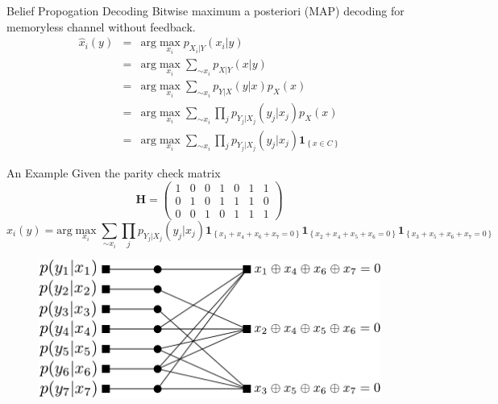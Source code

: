 \documentclass{beamer}
\begin{document}
  \begin{frame}{Belief Propogation Decoding}
  Bitwise maximum a posteriori (MAP) decoding for memoryless channel without feedback.
  \begin{eqnarray}
  \hat x_i( y) 	&=& \text{arg} \max_{x_i}p_{X_{i}|Y}(x_{i}| y) \label{eq:1}\\
		&=& \text{arg} \max_{x_i}\sum_{\sim x_i}p_{X|Y}( x| y) \label{eq:2}\\
		&=& \text{arg} \max_{x_i}\sum_{\sim x_i}p_{Y|X}( y| x)p_{X}( x) \label{eq:3}\\
		&=& \text{arg} \max_{x_i}\sum_{\sim x_i}\prod_{j}p_{Y_j|X_j}(y_j|x_j)p_{X}( x)\label{eq:4} \\
   		&=& \text{arg} \max_{x_i}\sum_{\sim x_i}\prod_{j}p_{Y_j|X_j}(y_j|x_j)\mathbf{1}_{\left\lbrace x\in C\right\rbrace} \label{eq:5}
  \end{eqnarray} 
  \end{frame}


  \begin{frame}{An Example}
   Given the parity check matrix
\begin{equation}
\label{H_matrix}
 \textbf{H} = 
 \left(
\begin{array}{ccccccc}
1 & 0 & 0 & 1 & 0 & 1 & 1  \\
0 & 1 & 0 & 1 & 1 & 1 & 0  \\
0 & 0 & 1 & 0 & 1 & 1 & 1 
\end{array}
\right)
\end{equation}
\fontsize{7pt}{7.2}\selectfont
\begin{equation}
\hat x_i(y) = \text{arg} \max_{x_i}\sum_{\sim x_i}\prod_{j}p_{Y_j|X_j}(y_j|x_j)\mathbf{1}_{\left\lbrace x_1 + x_4 + x_6 + x_7 = 0\right\rbrace}\mathbf{1}_{\left\lbrace x_2 + x_4 + x_5 + x_6 = 0\right\rbrace}\mathbf{1}_{\left\lbrace x_3 + x_5 + x_6 + x_7 = 0\right\rbrace} \label{eq:decoding_example}
\end{equation}
\begin{figure}[scale=0.5, !tp]
  \centering
  \includegraphics[scale=0.5]{factor_graph_channel}
\end{figure}
  \end{frame}
  
\end{document}
